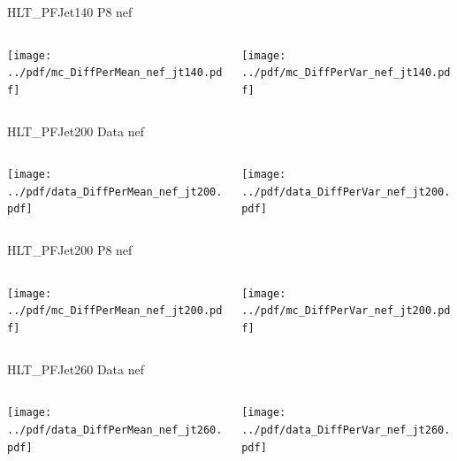 \documentclass[9pt]{beamer}
\begin{document}
\begin{frame}[t]{HLT\_PFJet140 P8 nef}
\begin{columns}[T]
  \begin{column}{.5\textwidth}
  \texttt{[image: ../pdf/mc\_DiffPerMean\_nef\_jt140.pdf]}
  \end{column}
  \begin{column}{.5\textwidth}
  \texttt{[image: ../pdf/mc\_DiffPerVar\_nef\_jt140.pdf]}
  \end{column}
\end{columns}
\end{frame}

\begin{frame}[t]{HLT\_PFJet200 Data nef}
\begin{columns}[T]
  \begin{column}{.5\textwidth}
  \texttt{[image: ../pdf/data\_DiffPerMean\_nef\_jt200.pdf]}
  \end{column}
  \begin{column}{.5\textwidth}
  \texttt{[image: ../pdf/data\_DiffPerVar\_nef\_jt200.pdf]}
  \end{column}
\end{columns}
\end{frame}

\begin{frame}[t]{HLT\_PFJet200 P8 nef}
\begin{columns}[T]
  \begin{column}{.5\textwidth}
  \texttt{[image: ../pdf/mc\_DiffPerMean\_nef\_jt200.pdf]}
  \end{column}
  \begin{column}{.5\textwidth}
  \texttt{[image: ../pdf/mc\_DiffPerVar\_nef\_jt200.pdf]}
  \end{column}
\end{columns}
\end{frame}

\begin{frame}[t]{HLT\_PFJet260 Data nef}
\begin{columns}[T]
  \begin{column}{.5\textwidth}
  \texttt{[image: ../pdf/data\_DiffPerMean\_nef\_jt260.pdf]}
  \end{column}
  \begin{column}{.5\textwidth}
  \texttt{[image: ../pdf/data\_DiffPerVar\_nef\_jt260.pdf]}
  \end{column}
\end{columns}
\end{frame}
\end{document}
